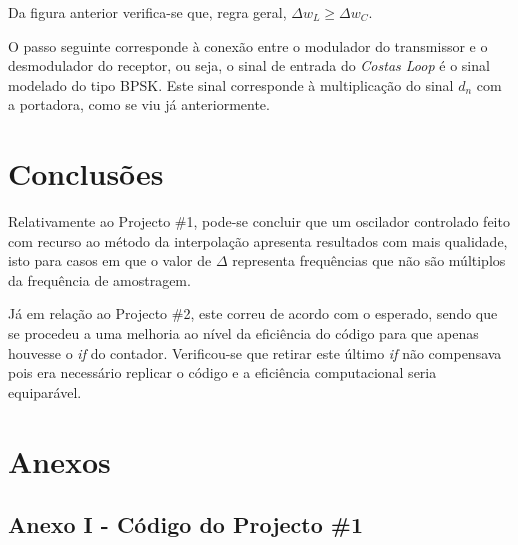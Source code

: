 \documentclass[11pt]{article}
\numberwithin{equation}{section}
\begin{document}
Da figura anterior verifica-se que, regra geral, $\Delta w_L \geq \Delta w_C$.


O passo seguinte corresponde à conexão entre o modulador do transmissor e o desmodulador do receptor, ou seja, o sinal de entrada do \textit{Costas Loop} é o sinal modelado do tipo BPSK. Este sinal corresponde à multiplicação do sinal $d_n$ com a portadora, como se viu já anteriormente.


\pagebreak

\section{Conclusões}

Relativamente ao Projecto \#1, pode-se concluir que um oscilador controlado feito com recurso ao método da interpolação apresenta resultados com mais qualidade, isto para casos em que o valor de $\Delta$ representa frequências que não são múltiplos da frequência de amostragem. 

Já em relação ao Projecto \#2, este correu de acordo com o esperado, sendo que se procedeu a uma melhoria ao nível da eficiência do código para que apenas houvesse o \textit{if} do contador. Verificou-se que retirar este último \textit{if} não compensava pois era necessário replicar o código e a eficiência computacional seria equiparável. 

\pagebreak

\section{Anexos}

\subsection{Anexo I - Código do Projecto \#1}
\end{document}
